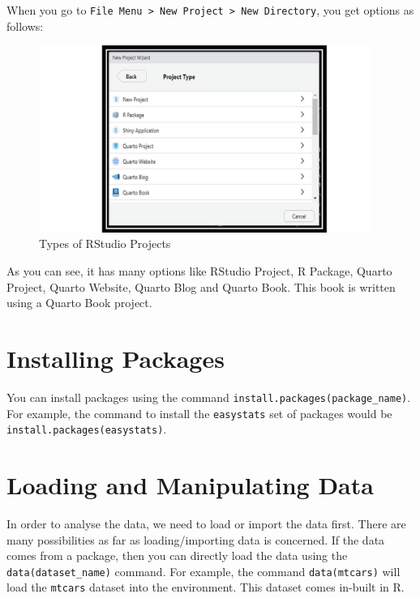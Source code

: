 \documentclass[
  letterpaper,
  paper =a4,
  twoside,
  openright,
  headsepline,
  footsepline,
  listof = totocnumbered,
  chapterprefix = true,
  firstiscover]{scrbook}
\begin{document}
When you go to
\texttt{File\ Menu\ \textgreater{}\ New\ Project\ \textgreater{}\ New\ Directory},
you get options as follows:

\begin{figure}[h]

{\centering \includegraphics[width=4.27in,height=\textheight]{images/New_Project.png}

}

\caption{\label{fig-rstudio-project}Types of RStudio Projects}

\end{figure}

As you can see, it has many options like RStudio Project, R Package,
Quarto Project, Quarto Website, Quarto Blog and Quarto Book. This book
is written using a Quarto Book project.

\hypertarget{installing-packages}{%
\section{Installing Packages}\label{installing-packages}}

You can install packages using the command
\texttt{install.packages(package\_name)}. For example, the command to
install the \texttt{easystats} set of packages would be
\texttt{install.packages(easystats)}.

\hypertarget{loading-and-manipulating-data}{%
\section{Loading and Manipulating
Data}\label{loading-and-manipulating-data}}

In order to analyse the data, we need to load or import the data first.
There are many possibilities as far as loading/importing data is
concerned. If the data comes from a package, then you can directly load
the data using the \texttt{data(dataset\_name)} command. For example,
the command \texttt{data(mtcars)} will load the \texttt{mtcars} dataset
into the environment. This dataset comes in-built in R.
\end{document}

